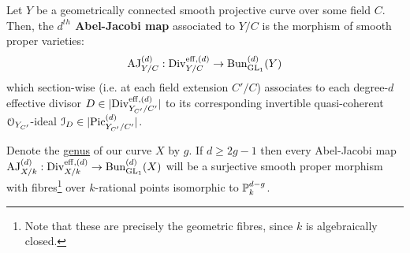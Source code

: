         \begin{definition} \label{def: the_abel_jacobi_map}
            Let $Y$ be a geometrically connected smooth projective curve over some field $C$. Then, the \textbf{$d^{th}$ Abel-Jacobi map} associated to $Y/C$ is the morphism of smooth proper varieties:
                $$\AJ_{Y/C}^{(d)}: \Div_{Y/C}^{\eff, (d)} \to \Bun_{\GL_1}^{(d)}(Y)$$
            which section-wise (i.e. at each field extension $C'/C$) associates to each degree-$d$ effective divisor $D \in |\Div_{Y_{C'}/C'}^{\eff, (d)}|$ to its corresponding invertible quasi-coherent $\calO_{Y_{C'}}$-ideal $\calI_D \in |\Pic_{Y_{C'}/C'}^{(d)}|$.
        \end{definition}
        \begin{proposition} \label{prop: the_abel_jacobi_map_is_a_smooth_fibration}
            Denote the \href{https://stacks.math.columbia.edu/tag/0BY6}{\underline{genus}} of our curve $X$ by $g$. If $d \geq 2g - 1$ then every Abel-Jacobi map $\AJ_{X/k}^{(d)}: \Div_{X/k}^{\eff, (d)} \to \Bun_{\GL_1}^{(d)}(X)$ will be a surjective smooth proper morphism with fibres\footnote{Note that these are precisely the geometric fibres, since $k$ is algebraically closed.} over $k$-rational points isomorphic to $\P^{d - g}_k$.
        \end{proposition}
